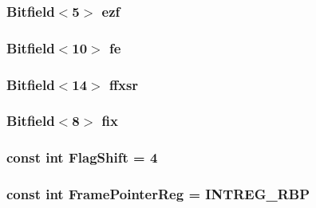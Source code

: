 \label{namespaceX86ISA_a33304412ade61b5bca30e94dc472de6b}
\hypertarget{namespaceX86ISA_af1d947c6379024c0d66832c2e1e9fd84}{
\subsubsection[{ezf}]{\setlength{\rightskip}{0pt plus 5cm}Bitfield$<$5$>$ {\bf ezf}}}
\label{namespaceX86ISA_af1d947c6379024c0d66832c2e1e9fd84}
\hypertarget{namespaceX86ISA_a003aa902c68ccf1aad688fbf05ab431c}{
\subsubsection[{fe}]{\setlength{\rightskip}{0pt plus 5cm}Bitfield$<$10$>$ {\bf fe}}}
\label{namespaceX86ISA_a003aa902c68ccf1aad688fbf05ab431c}
\hypertarget{namespaceX86ISA_a44fd74341f9a5b091e085b506f580581}{
\subsubsection[{ffxsr}]{\setlength{\rightskip}{0pt plus 5cm}Bitfield$<$14$>$ {\bf ffxsr}}}
\label{namespaceX86ISA_a44fd74341f9a5b091e085b506f580581}
\hypertarget{namespaceX86ISA_ad2093a3e0b017036ef7d78a3422f07ab}{
\subsubsection[{fix}]{\setlength{\rightskip}{0pt plus 5cm}Bitfield$<$8$>$ {\bf fix}}}
\label{namespaceX86ISA_ad2093a3e0b017036ef7d78a3422f07ab}
\hypertarget{namespaceX86ISA_aa3993f768fd6f39c79856c9039c7523f}{
\subsubsection[{FlagShift}]{\setlength{\rightskip}{0pt plus 5cm}const int {\bf FlagShift} = 4}}
\label{namespaceX86ISA_aa3993f768fd6f39c79856c9039c7523f}
\hypertarget{namespaceX86ISA_aabd6fa5889c9ccc124dfd4a984046f6f}{
\subsubsection[{FramePointerReg}]{\setlength{\rightskip}{0pt plus 5cm}const int {\bf FramePointerReg} = INTREG\_\-RBP}}
